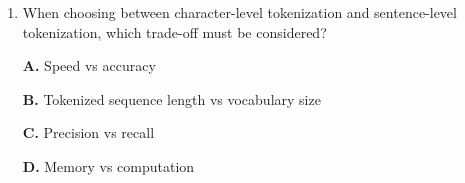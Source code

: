 \documentclass[11pt]{article}
\begin{document}
\begin{enumerate}[label=Q\arabic*., leftmargin=*]
\textbf{A.} It cannot represent overlapping or nested entities

\textbf{B.} It requires too many labels

\textbf{C.} It does not support multiple entity types

\textbf{D.} It ignores entity boundaries

\item When choosing between character-level tokenization and sentence-level tokenization, which trade-off must be considered?

\textbf{A.} Speed vs accuracy

\textbf{B.} Tokenized sequence length vs vocabulary size

\textbf{C.} Precision vs recall

\textbf{D.} Memory vs computation

\end{enumerate}
\end{document}
